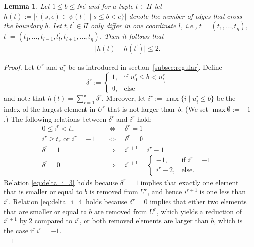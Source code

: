\documentclass[a4paper,
               10pt,
               pdftex,
               normalheadings,
               headsepline,
               footsepline,
               headinclude,
               footinclude,
               DIV=14,
               abstracton]
{scrartcl}
\newtheorem{lemma}[theorem]{Lemma}
\newcommand{\ldif}{l}
\begin{document}
\begin{lemma} \label{lemma:A_boundary_crossing}
Let $1\leq b \leq Nd$ and for a tuple $t \in \Pi$ let $h(t) := |\{(s, e) \in \psi(t) \mid s \leq b < e\}|$ denote the number of edges that cross the boundary $b$.
Let $t, t^\prime \in \Pi$ only differ in one coordinate $\ldif$, i.e., $t = (t_1, \dots, t_\eta)$, $t^\prime = (t_1,\dots,t_{\ldif - 1}, t_\ldif^\prime, t_{\ldif + 1}, \dots, t_\eta)$.
Then it follows that
\begin{align}
    \lvert h(t) - h(t^\prime) \rvert \leq 2.
\end{align}
\end{lemma}
\begin{proof}
    Let $U^r$ and $u_i^r$ be as introduced in section~\ref{subsec:regular}. Define
\begin{equation}
\label{eq:delta_def}
    \delta^r := \begin{cases}
        1, & \text{if } u_0^r \leq b < u_{t_r}^r\\
        0, & \text{else}
    \end{cases}
\end{equation}
and note that $h(t) = \sum_{r=1}^\eta \delta^r$.
Moreover, let $i^r := \max \{i \mid u_i^r \leq b\}$ be the index of the largest element in $U^r$ that is not larger than~$b$. (We set $\max \emptyset := -1$.)
The following relations between $\delta^r$ and $i^r$ hold:
\begin{align}
0 \leq i^r < t_r \quad &\Leftrightarrow \quad \delta^r = 1 \label{eq:delta_i_1}\\
    i^r \geq t_r \text{ or } i^r = -1 \quad &\Leftrightarrow \quad \delta^r = 0 \label{eq:delta_i_2}\\
    \delta^r = 1 \quad &\Rightarrow \quad i^{r+1} = i^r - 1 \label{eq:delta_i_3}\\
    \delta^r = 0 \quad &\Rightarrow \quad i^{r+1} =
    \begin{cases}
    -1, & \text{if } i^r = -1\\
    i^r - 2, & \text{else.} \label{eq:delta_i_4}
    \end{cases}
\end{align}
Relation \eqref{eq:delta_i_3} holds because $\delta^r = 1$ implies that exactly one element that is smaller or equal to $b$ is removed from $U^r$, and hence $i^{r+1}$ is one less than $i^{r}$.
Relation \eqref{eq:delta_i_4} holds because $\delta^r = 0$ implies that either two elements that are smaller or equal to $b$ are removed from $U^r$, which yields a reduction of $i^{r+1}$ by 2 compared to $i^{r}$, or both removed elements are larger than $b$, which is the case if $i^r = -1$.\\

\end{proof}
\end{document}
